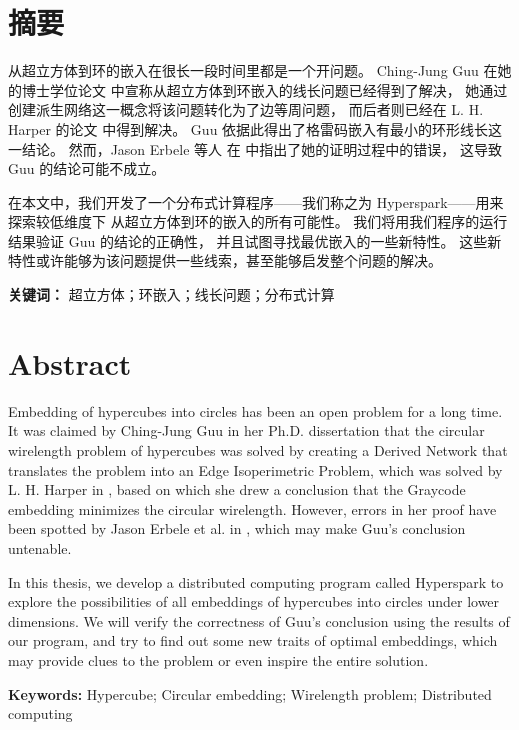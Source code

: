 
\chapter*{摘要}
\label{Abstract CN}

从超立方体到环的嵌入在很长一段时间里都是一个开问题。
Ching-Jung Guu 在她的博士学位论文 \cite{Guu.1997} 中宣称从超立方体到环嵌入的线长问题已经得到了解决，
她通过创建派生网络这一概念将该问题转化为了边等周问题，
而后者则已经在 L. H. Harper 的论文 \cite{Harper.1964} 中得到解决。
Guu 依据此得出了格雷码嵌入有最小的环形线长这一结论。
然而，Jason Erbele 等人 在 \cite{Erbele.2003} 中指出了她的证明过程中的错误，
这导致 Guu 的结论可能不成立。

在本文中，我们开发了一个分布式计算程序——我们称之为 Hyperspark——用来探索较低维度下
从超立方体到环的嵌入的所有可能性。
我们将用我们程序的运行结果验证 Guu 的结论的正确性，
并且试图寻找最优嵌入的一些新特性。
这些新特性或许能够为该问题提供一些线索，甚至能够启发整个问题的解决。
\hfill\break

\textbf{关键词：} 超立方体；环嵌入；线长问题；分布式计算

\chapter*{Abstract}
\label{Abstract EN}

Embedding of hypercubes into circles has been an open problem for a long time.
It was claimed by Ching-Jung Guu in her Ph.D. dissertation \cite{Guu.1997} that
the circular wirelength problem of hypercubes was solved by creating a Derived
Network that translates the problem into an Edge Isoperimetric Problem,
which was solved by L. H. Harper in \cite{Harper.1964}, based on which
she drew a conclusion that the Graycode embedding minimizes the circular wirelength.
However, errors in her proof have been spotted by Jason Erbele et al. in \cite{Erbele.2003},
which may make Guu's conclusion untenable.

In this thesis, we develop a distributed computing program called Hyperspark to
explore the possibilities of all embeddings of hypercubes into circles under lower dimensions.
We will verify the correctness of Guu's conclusion using the results of our program,
and try to find out some new traits of optimal embeddings,
which may provide clues to the problem or even inspire the entire solution.
\hfill\break

\textbf{Keywords:} Hypercube; Circular embedding; Wirelength problem;
Distributed computing
